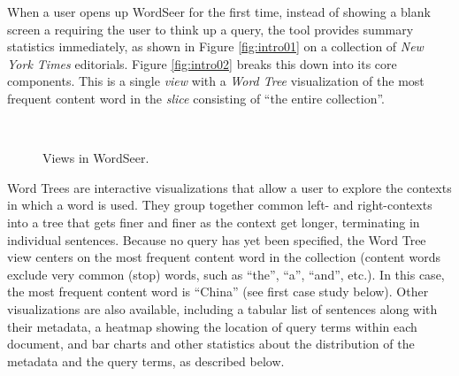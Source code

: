 \documentclass{sig-alternate}
\begin{document}
When a user opens up WordSeer for the first time, instead of  showing a blank screen a requiring the user to think up a query, the tool  provides summary statistics immediately, as shown in Figure \ref{fig:intro01} on a collection of \emph{New York Times} editorials.  Figure \ref{fig:intro02} breaks this down into its core components. This is a single \emph{view} with a \emph{Word Tree} visualization of the most frequent content word in the \emph{slice} consisting of ``the entire collection''. 

\begin{figure}[ht!]
\begin{center}
%
        \\
%
    \end{center}
    \caption{%
       Views in WordSeer.
     }%
\end{figure}

Word Trees \cite{wattenberg_word_2008} are interactive visualizations that allow a user to explore the contexts in which a word is used. They group together common left- and right-contexts into a tree that gets finer and finer as the context get longer, terminating in individual sentences.  Because no query has yet been specified, the Word Tree view centers on the most frequent content word in the collection (content words exclude very common (stop) words, such as ``the'', ``a'', ``and'', etc.). In this case, the most frequent content word is ``China'' (see first case study below).  Other visualizations are also available, including a tabular list of sentences along with their metadata, a heatmap showing the location of query terms within each document, and bar charts and other statistics about the distribution of the metadata and the query terms, as described below.
\end{document}
